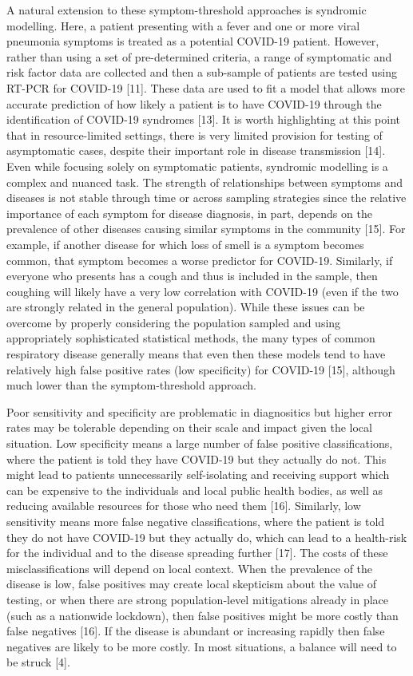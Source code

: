 \documentclass[]{elsarticle} %
\begin{document}
A natural extension to these symptom-threshold approaches is syndromic
modelling. Here, a patient presenting with a fever and one or more viral
pneumonia symptoms is treated as a potential COVID-19 patient. However,
rather than using a set of pre-determined criteria, a range of
symptomatic and risk factor data are collected and then a sub-sample of
patients are tested using RT-PCR for COVID-19 {[}11{]}. These data are
used to fit a model that allows more accurate prediction of how likely a
patient is to have COVID-19 through the identification of COVID-19
syndromes {[}13{]}. It is worth highlighting at this point that in
resource-limited settings, there is very limited provision for testing
of asymptomatic cases, despite their important role in disease
transmission {[}14{]}. Even while focusing solely on symptomatic
patients, syndromic modelling is a complex and nuanced task. The
strength of relationships between symptoms and diseases is not stable
through time or across sampling strategies since the relative importance
of each symptom for disease diagnosis, in part, depends on the
prevalence of other diseases causing similar symptoms in the community
{[}15{]}. For example, if another disease for which loss of smell is a
symptom becomes common, that symptom becomes a worse predictor for
COVID-19. Similarly, if everyone who presents has a cough and thus is
included in the sample, then coughing will likely have a very low
correlation with COVID-19 (even if the two are strongly related in the
general population). While these issues can be overcome by properly
considering the population sampled and using appropriately sophisticated
statistical methods, the many types of common respiratory disease
generally means that even then these models tend to have relatively high
false positive rates (low specificity) for COVID-19 {[}15{]}, although
much lower than the symptom-threshold approach.

Poor sensitivity and specificity are problematic in diagnositics but
higher error rates may be tolerable depending on their scale and impact
given the local situation. Low specificity means a large number of false
positive classifications, where the patient is told they have COVID-19
but they actually do not. This might lead to patients unnecessarily
self-isolating and receiving support which can be expensive to the
individuals and local public health bodies, as well as reducing
available resources for those who need them {[}16{]}. Similarly, low
sensitivity means more false negative classifications, where the patient
is told they do not have COVID-19 but they actually do, which can lead
to a health-risk for the individual and to the disease spreading further
{[}17{]}. The costs of these misclassifications will depend on local
context. When the prevalence of the disease is low, false positives may
create local skepticism about the value of testing, or when there are
strong population-level mitigations already in place (such as a
nationwide lockdown), then false positives might be more costly than
false negatives {[}16{]}. If the disease is abundant or increasing
rapidly then false negatives are likely to be more costly. In most
situations, a balance will need to be struck {[}4{]}.
\end{document}
